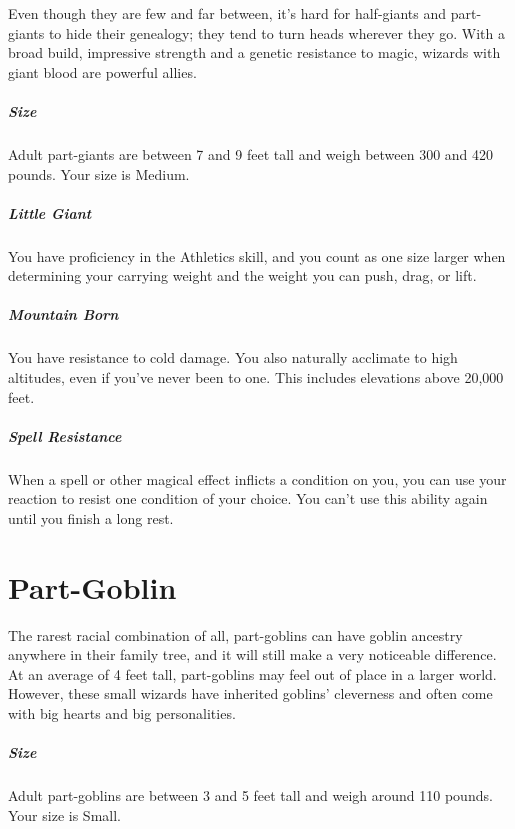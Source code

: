 \documentclass[a4paper,twocolumn,openany,nodeprecatedcode]{dndbook}
\begin{document}
        Even though they are few and far between, it's hard for half-giants and part-giants to hide their genealogy; they tend to turn heads wherever they go. With a broad build, impressive strength and a genetic resistance to magic, wizards with giant blood are powerful allies.

        \subparagraph{Size} Adult part-giants are between 7 and 9 feet tall and weigh between 300 and 420 pounds. Your size is Medium.

        \subparagraph{Little Giant} You have proficiency in the Athletics skill, and you count as one size larger when determining your carrying weight and the weight you can push, drag, or lift.

        \subparagraph{Mountain Born} You have resistance to cold damage. You also naturally acclimate to high altitudes, even if you've never been to one. This includes elevations above 20,000 feet.


        \subparagraph{Spell Resistance} When a spell or other magical effect inflicts a condition on you, you can use your reaction to resist one condition of your choice. You can't use this ability again until you finish a long rest.


    \section{Part-Goblin}

        The rarest racial combination of all, part-goblins can have goblin ancestry anywhere in their family tree, and it will still make a very noticeable difference. At an average of 4 feet tall, part-goblins may feel out of place in a larger world. However, these small wizards have inherited goblins' cleverness and often come with big hearts and big personalities.

        \subparagraph{Size} Adult part-goblins are between 3 and 5 feet tall and weigh around 110 pounds. Your size is Small.
\end{document}

